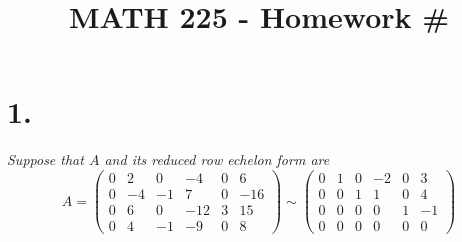 \documentclass[12pt]{article}
\title{\vspace{-2\baselineskip}MATH 225 - Homework \#\HOMEWORKNUM}
\author{\NAME}
\date{\DATE}
\begin{document}
\maketitle

\section*{1.}
\textit{Suppose that $A$ and its reduced row echelon form are}
\begin{equation*}
	A
	=
	\begin{pmatrix}
		0 & 2 & 0 & -4 & 0 & 6 \\
		0 & -4 & -1 & 7 & 0 & -16 \\
		0 & 6 & 0 & -12 & 3 & 15 \\
		0 & 4 & -1 & -9 & 0 & 8
	\end{pmatrix}
	\sim
	\begin{pmatrix}
		0 & 1 & 0 & -2 & 0 & 3 \\
		0 & 0 & 1 & 1 & 0 & 4 \\
		0 & 0 & 0 & 0 & 1 & -1 \\
		0 & 0 & 0 & 0 & 0 & 0
	\end{pmatrix}
\end{equation*}
\end{document}
